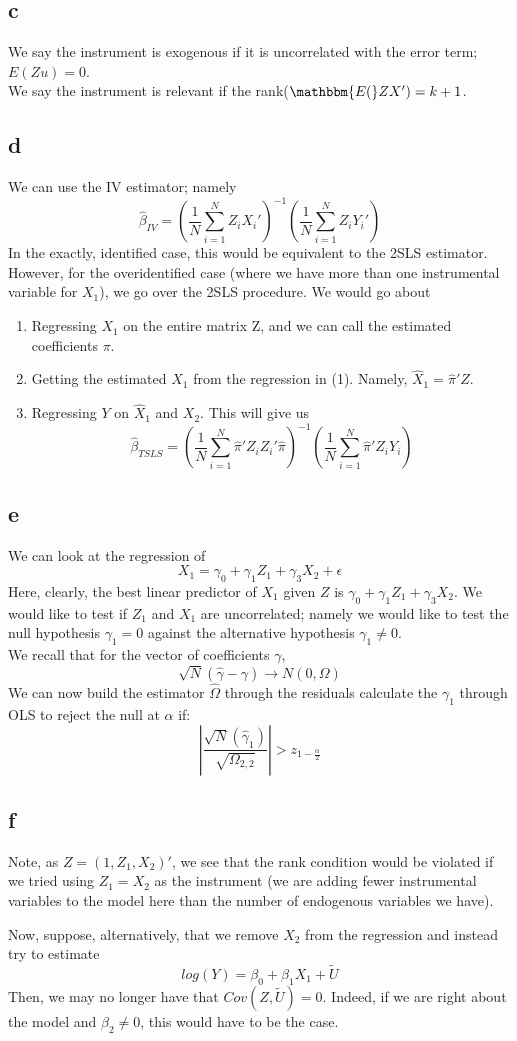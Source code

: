 \documentclass{article}
\begin{document}
\subsection*{c} We say the instrument is exogenous if it is uncorrelated with the error term; $E(Zu) = 0$. \\
We say the instrument is relevant if the rank($\mathbbm{E(}ZX') = k+1$. \\
\subsection*{d} We can use the IV estimator; namely 
$$\hat \beta_{IV} = (\frac{1}{N} \sum_{i=1}^N Z_iX_i')^{-1} (\frac{1}{N}\sum_{i=1}^N Z_iY_i')$$
In the exactly, identified case, this would be equivalent to the 2SLS estimator. However, for the overidentified case (where we have more than one instrumental variable for $X_1$), we go over the 2SLS procedure. We would go about 
\begin{enumerate}
    \item Regressing $X_1$ on the entire matrix Z, and we can call the estimated coefficients $\pi$.
    \item Getting the estimated $X_1$ from the regression in (1). Namely, $\hat X_1 = \hat \pi' Z$.
    \item Regressing $Y$ on $\hat X_1$ and $X_2$. This will give us
$$\hat \beta_{TSLS} = (\frac{1}{N} \sum_{i=1}^N \hat \pi' Z_i Z_i'\hat \pi)^{-1} (\frac{1}{N}\sum_{i=1}^N \hat \pi' Z_i Y_i)$$
\end{enumerate}

\subsection*{e} We can look at the regression of $$X_1 = \gamma_0 + \gamma_1 Z_1 + \gamma_3 X_2 + \epsilon$$
Here, clearly, the best linear predictor of $X_1$ given $Z$ is $\gamma_0 + \gamma_1 Z_1 + \gamma_3 X_2$. We would like to test if $Z_1$ and $X_1$ are uncorrelated; namely we would like to test the null hypothesis $\gamma_1 = 0$ against the alternative hypothesis $\gamma_1 \neq 0$. \\
We recall that for the vector of coefficients $\gamma$, $$\sqrt{N}(\hat \gamma - \gamma) \rightarrow N(0,\Omega)$$
We can now build the estimator $\hat \Omega$ through the residuals calculate the $\gamma_1$ through OLS to reject the null at $\alpha$ if:
$$|\frac{\sqrt{N}(\hat \gamma_1)}{\sqrt{\Omega_{2,2}}}| > z_{1-\frac{\alpha}{2}}$$
\subsection*{f} Note, as $Z = (1,Z_1,X_2)'$, we see that the rank condition would be violated if we tried using $Z_1 = X_2$ as the instrument (we are adding fewer instrumental variables to the model here than the number of endogenous variables we have). \par
Now, suppose, alternatively, that we remove $X_2$ from the regression and instead try to estimate 
$$log(Y) = \beta_0 + \beta_1 X_1 + \tilde U$$
Then, we may no longer have that $Cov(Z,\tilde U) = 0$. Indeed, if we are right about the model and $\beta_2 \neq 0$, this would have to be the case. 
\end{document}
